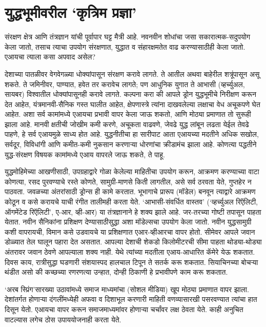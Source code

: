 \chapter{युद्धभूमीवरील `कृत्रिम प्रज्ञा'}

संरक्षण क्षेत्र आणि तंत्रज्ञान यांची पूर्वापार घट्ट मैत्री आहे. नवनवीन शोधांचा जसा सकारात्मक-सदुपयोग केला जातो, तसाच त्याचा उपयोग संरक्षणात, युद्धात व संहारक्षमतेत वाढ करण्यासाठीही केला जातो. एआयचा त्याला कसा अपवाद असेल?

देशाच्या पातळीवर वेगवेगळ्या धोक्यांपासून संरक्षण करावे लागते. ते आतील अथवा बाहेरील शत्रूंपासून असू शकते. ते जमिनीवर, पाण्यात, हवेत तर करावेच लागते; पण आधुनिक युगात ते आभासी (व्हर्च्युअल, सायबर) विश्वातील धोक्यांपासूनही करावे लागते. कल्पना करा की आपले ड्रोन युद्धभूमीचे निरीक्षण करून देत आहेत, यंत्रमानवी-सैनिक गस्त घालीत आहेत, क्षेपणास्त्रे त्यांना दाखवलेल्या लक्षाचा वेध अचूकपणे घेत आहेत. अशा सर्व कामांमध्ये एआयचा प्रभावी वापर केला जाऊ शकतो, आणि मोठ्या प्रमाणात तो सुरूही झाला आहे. मानवी क्षतीची जोखीम कमी करणे, अचूकता वाढवणे, जेवढे युद्ध लांबून लढता येईल तेवढे पाहणे, हे सर्व एआयमुळे साध्य होत आहे. युद्धनीतीचा हा सारीपाट आता एआयच्या मदतीने अधिक सखोल, सर्वदूर, विविधांगी आणि कमीत-कमी नुकसान करणाऱ्या धोरणांचा क्रीडामंच झाला आहे. कोणत्या पद्धतीने युद्ध-संरक्षण विषयक कामांमध्ये एआय वापरले जाऊ शकते, ते पाहू.

युद्धमोहिमेच्या आखणीसाठी, उपग्रहाद्वारे गोळा केलेल्या माहितीचा उपयोग करून, आक्रमण करण्याच्या वाटा कोणत्या, रसद पुरवण्याचे रस्ते कोणते, सामुग्री-माणसे किती लागतील, असे सर्व ठरवता येते, गुप्तहेर न पाठवता. जवळच्या अंतरांसाठी ड्रोन्स ही कामे करतात. भूभागाचे प्रारूप (मॉडेल) बनवून त्याद्वारे आक्रमण कोठून व कसे करायचे याची रंगीत तालीमही करता येते. `आभासी-संवर्धित वास्तव' (`व्हर्च्युअल रिऍलिटी, ऑगमेंटेड रिऍलिटी', ए-आर, व्ही-आर) या तंत्रज्ञानाने हे शक्य झाले आहे. जर-तरच्या गोष्टी तपासून पाहता येतात. नवीन सैनिकांना प्रशिक्षण देण्यासाठीसुद्धा अशा मॉडेल्सचा उपयोग केला जातो.  नवीन युद्धसामुग्री कशी वापरायची, विमान कसे उडवायचे या प्रशिक्षणात एआर-व्हीआरचा वापर होतो. सीमेवर आपले जवान डोळ्यात तेल घालून पहारा देत असतात. आपल्या देशाची शेकडो किलोमीटरची सीमा पाहता थोड्या-थोड्या अंतरावर जवान ठेवणे आपल्याला शक्य नाही. येथे त्यांच्या मदतीला एआय-आधारित कॅमेरे येऊ शकतात. दिवस काय, रात्रीसुद्धा घडणारी संशयास्पद हालचाल टिपून ते सतर्क करू शकतात. सियाचिनच्या बोचऱ्या थंडीत असो की कच्छच्या रणरणत्या उन्हात, दोन्ही ठिकाणी हे प्रभावीपणे काम करू शकतात. 

`अरब स्प्रिंग'सारख्या उठावांमध्ये समाज माध्यमांचा (सोशल मीडिया) खूप मोठ्या प्रमाणात वापर झाला. देशांतर्गत होणाऱ्या दंगलींमध्येही अफवा व दिशाभूल करणारी माहिती वणव्यासारखी पसरवण्यात त्यांचा हात दिसून येतो. एआयचा वापर करून समाजमाध्यमांवर होणाऱ्या चर्चांवर लक्ष ठेवता येते. काही अनुचित वाटल्यास लगेच ठोस उपाययोजनाही करता येते. 

